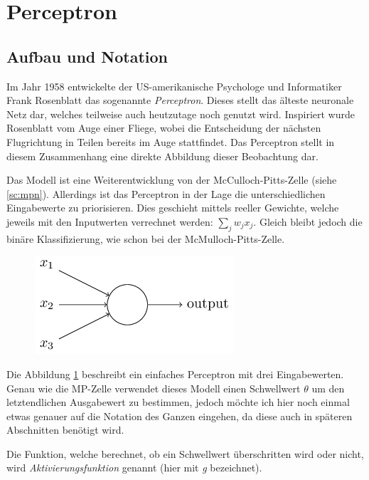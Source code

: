 \section{Perceptron} \label{sc:per}

\subsection{Aufbau und Notation}

Im Jahr 1958 entwickelte der US-amerikanische Psychologe und Informatiker Frank Rosenblatt das sogenannte \emph{Perceptron}. Dieses stellt das älteste neuronale Netz dar, welches teilweise auch heutzutage noch genutzt wird. Inspiriert wurde Rosenblatt vom Auge einer Fliege, wobei die Entscheidung der nächsten Flugrichtung in Teilen bereits im Auge stattfindet. Das Perceptron stellt in diesem Zusammenhang eine direkte Abbildung dieser Beobachtung dar.

Das Modell ist eine Weiterentwicklung von der McCulloch-Pitts-Zelle (siehe \autoref{sc:mpn}). Allerdings ist das Perceptron in der Lage die unterschiedlichen Eingabewerte zu priorisieren. Dies geschieht mittels reeller Gewichte, welche jeweils mit den Inputwerten verrechnet werden: $\sum_j w_j x_j$. Gleich bleibt jedoch die binäre Klassifizierung, wie schon bei der McMulloch-Pitts-Zelle.

\begin{figure}[!htb]
	\centering
	\includegraphics[width=.5\linewidth]{./img/erstesPerceptron}
	\label{fig:erstesPerceptron}
\end{figure}

Die Abbildung \ref{fig:erstesPerceptron} beschreibt ein einfaches Perceptron mit drei Eingabewerten. Genau wie die MP-Zelle verwendet dieses Modell einen Schwellwert $\theta$ um den letztendlichen Ausgabewert zu bestimmen, jedoch möchte ich hier noch einmal etwas genauer auf die Notation des Ganzen eingehen, da diese auch in späteren Abschnitten benötigt wird.

Die Funktion, welche berechnet, ob ein Schwellwert überschritten wird oder nicht, wird \emph{Aktivierungsfunktion} genannt (hier mit \emph{g} bezeichnet).

